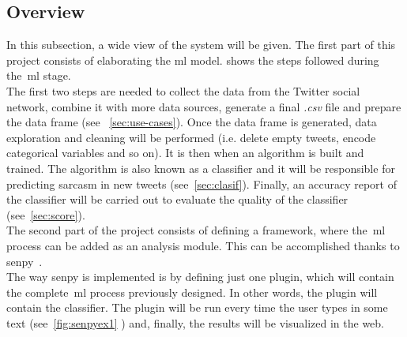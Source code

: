 \subsection{Overview}
In this subsection, a wide view of the system will be given. The first part of this project consists of elaborating the \ac{ml} model.
 shows the steps followed during the~\ac{ml} stage.\\
The first two steps are needed to collect the data from the Twitter social network, combine it with more data sources, generate a final \textit{.csv} file and prepare the data frame (see ~\cref{sec:use-cases}). Once the data frame is generated, data exploration and cleaning will be performed (i.e. delete empty tweets, encode categorical variables and so on). It is then when an algorithm is built and trained. The algorithm is also known as a classifier and it will be responsible for predicting sarcasm in new tweets (see~\cref{sec:clasif}). Finally, an accuracy report of the classifier will be carried out to evaluate the quality of the classifier (see~\cref{sec:score}).\\
The second part of the project consists of defining a framework, where the~\ac{ml} process can be added as an analysis module. This can be accomplished thanks to senpy~\cite{senpy}.\\
The way senpy is implemented is by defining just one plugin, which will contain the complete~\ac{ml} process previously designed.  In other words, the plugin will contain the classifier. The plugin will be run every time the user types in some text (see~\cref{fig:senpyex1} ) and, finally, the results will be visualized in the web.
